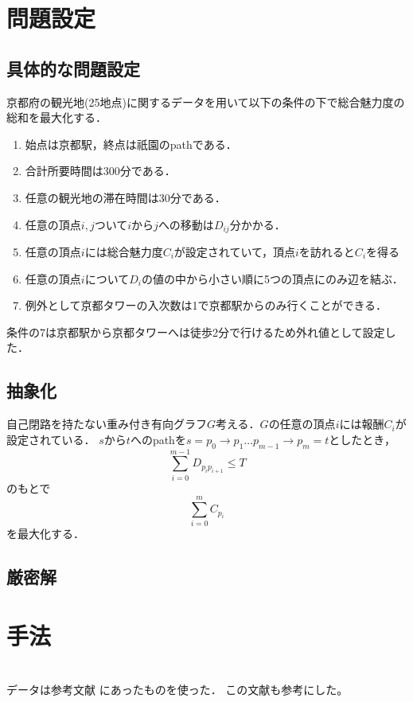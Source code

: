\documentclass[a4paper,12pt]{jsreport}
\theoremstyle{definition}
\begin{document}
\chapter{問題設定}
\section{具体的な問題設定}
京都府の観光地(25地点)に関するデータを用いて以下の条件の下で総合魅力度の総和を最大化する．
\begin{enumerate}
    \item 始点は京都駅，終点は祇園のpathである．
    \item 合計所要時間は300分である．
    \item 任意の観光地の滞在時間は30分である．
    \item 任意の頂点$i,j$ついて$i$から$j$への移動は$D_{ij}$分かかる．
    \item 任意の頂点$i$には総合魅力度$C_i$が設定されていて，頂点$i$を訪れると$C_i$を得る
    \item 任意の頂点$i$について$D_i$の値の中から小さい順に5つの頂点にのみ辺を結ぶ．
    \item 例外として京都タワーの入次数は1で京都駅からのみ行くことができる．
\end{enumerate}
条件の7は京都駅から京都タワーへは徒歩2分で行けるため外れ値として設定した．
\section{抽象化}
自己閉路を持たない重み付き有向グラフ$G$考える．$G$の任意の頂点$i$には報酬$C_i$が設定されている．
$s$から$t$へのpathを$s=p_0\to p_1 \ldots p_{m-1}\to p_m=t$としたとき，
\begin{equation}
    \sum_{i=0}^{m-1} D_{p_ip_{i+1}}\leq T
\end{equation}
のもとで
\begin{equation}
    \sum_{i=0}^{m} C_{p_i}
\end{equation}
を最大化する．
\section{厳密解}
\chapter{手法}






\chapter{}
データは参考文献\cite{rika} にあったものを使った．
この文献\cite{ten}も参考にした。
\end{document}
